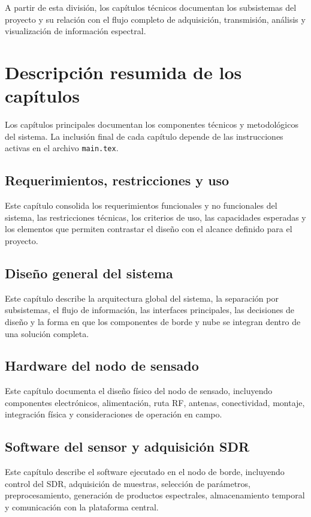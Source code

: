 A partir de esta división, los capítulos técnicos documentan los subsistemas del proyecto y su relación con el flujo completo de adquisición, transmisión, análisis y visualización de información espectral.

\section{Descripción resumida de los capítulos}

Los capítulos principales documentan los componentes técnicos y metodológicos del sistema. La inclusión final de cada capítulo depende de las instrucciones activas en el archivo \texttt{main.tex}.

\subsection{Requerimientos, restricciones y uso}

Este capítulo consolida los requerimientos funcionales y no funcionales del sistema, las restricciones técnicas, los criterios de uso, las capacidades esperadas y los elementos que permiten contrastar el diseño con el alcance definido para el proyecto.

\subsection{Diseño general del sistema}

Este capítulo describe la arquitectura global del sistema, la separación por subsistemas, el flujo de información, las interfaces principales, las decisiones de diseño y la forma en que los componentes de borde y nube se integran dentro de una solución completa.

\subsection{Hardware del nodo de sensado}

Este capítulo documenta el diseño físico del nodo de sensado, incluyendo componentes electrónicos, alimentación, ruta RF, antenas, conectividad, montaje, integración física y consideraciones de operación en campo.

\subsection{Software del sensor y adquisición SDR}

Este capítulo describe el software ejecutado en el nodo de borde, incluyendo control del SDR, adquisición de muestras, selección de parámetros, preprocesamiento, generación de productos espectrales, almacenamiento temporal y comunicación con la plataforma central.

